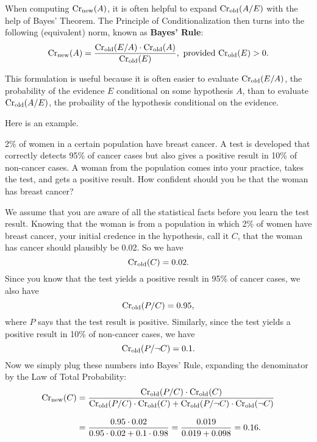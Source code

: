 
When computing $\text{Cr}_\text{new}(A)$, it is often helpful to expand
$\text{Cr}_\text{old}(A/E)$ with the help of Bayes' Theorem. The Principle of
Conditionalization then turns into the following (equivalent) norm, known as
\textbf{Bayes' Rule}:
%
\[
\text{Cr}_{\text{new}}(A) = \frac{\text{Cr}_{\text{old}}(E/A) \cdot \text{Cr}_{\text{old}}(A)}{\text{Cr}_{\text{old}}(E)}, \text{ provided $\text{Cr}_\text{old}(E) > 0$}.
\]

This formulation is useful because it is often easier to evaluate
$\text{Cr$_{\text{old}}$}(E/A)$, the probability of the evidence $E$ conditional on some hypothesis
$A$, than to evaluate $\text{Cr$_{\text{old}}$}(A/E)$, the probaility of the hypothesis conditional
on the evidence.

Here is an example.
\begin{example}\label{ex:base}
  2\% of women in a certain population have breast cancer. A test is developed
  that correctly detects 95\% of cancer cases but also gives a positive
  result in 10\% of non-cancer cases. A woman from the population comes into
  your practice, takes the test, and gets a positive result. How confident
  should you be that the woman has breast cancer?
\end{example}

We assume that you are aware of all the statistical facts before you learn the
test result. Knowing that the woman is from a population in which 2\% of women
have breast cancer, your initial credence in the hypothesis, call it $C$, that
the woman has cancer should plausibly be 0.02. So we have
\[
  \text{Cr}_\text{old}(C) = 0.02.
\]
Since you know that the test yields a positive
result in 95\% of cancer cases, we also have
\[
  \text{Cr}_{\text{old}}(P/C) = 0.95,
\]
where $P$ says that the test result is positive. Similarly, since the test
yields a positive result in 10\% of non-cancer cases, we have
\[
  \text{Cr}_{\text{old}}(P/\neg C) = 0.1.
\]
Now we simply plug these numbers into Bayes' Rule, expanding the denominator by
the Law of Total Probability:
%
\begin{align*}
  \text{Cr}_{\text{new}}(C) &= \frac{\text{Cr}_{\text{old}}(P/C) \cdot
  \text{Cr}_{\text{old}}(C)}{\text{Cr}_\text{old}(P/C) \cdot \text{Cr}_\text{old}(C) +
  \text{Cr}_\text{old}(P/\neg C)\cdot \text{Cr}_\text{old}(\neg C)}\\[3mm]
  &= \frac{0.95 \cdot 0.02}{0.95 \cdot 0.02 + 0.1 \cdot 0.98} = \frac{0.019}{0.019 + 0.098} = 0.16.
\end{align*}

